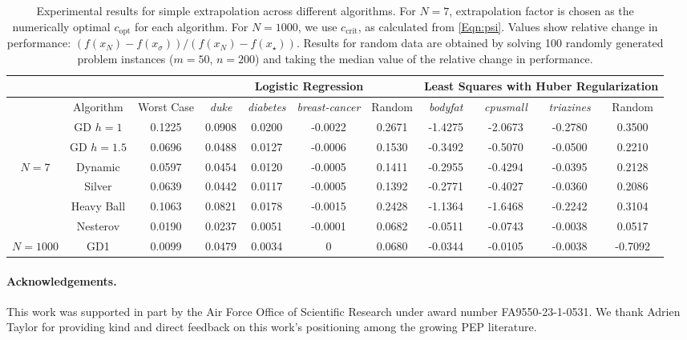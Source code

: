 \documentclass[11pt]{article}
\numberwithin{equation}{section}
\theoremstyle{definition}
\theoremstyle{definition}
\theoremstyle{definition}
\newcommand{\1}{\mathbf{1}}
\newcommand{\cCrit}{c_\mathrm{crit}}
\newcommand{\cOpt}{c_{\text{opt}}}
\begin{document}
\begin{table}
    \centering\scriptsize
    \begin{tabular}{|c|c|c|c|c|c|c|c|c|c|c|}
        \hline
         & & & \multicolumn{4}{|c|}{Logistic Regression} & \multicolumn{4}{|c|}{Least Squares with Huber Regularization} \\
        \hline
             & Algorithm & Worst Case & \textit{duke} & \textit{diabetes} & \textit{breast-cancer}  & Random & \textit{bodyfat} & \textit{cpusmall} & \textit{triazines} & Random\\
        \hline
         & GD $h=1$ & 0.1225 & 0.0908  & 0.0200 & -0.0022  & 0.2671 &
         -1.4275 & -2.0673 & -0.2780 & 0.3500 \\
         & GD $h=1.5$ & 0.0696 & 0.0488 & 0.0127 & -0.0006 & 0.1530 &
         -0.3492 & -0.5070 & -0.0500 & 0.2210 \\
         $N=7$ & Dynamic & 0.0597 & 0.0454 & 0.0120 & -0.0005 &  0.1411 &
         -0.2955 & -0.4294 & -0.0395 & 0.2128 \\
         & Silver & 0.0639 & 0.0442 & 0.0117 & -0.0005  & 0.1392 &
         -0.2771 & -0.4027 & -0.0360 & 0.2086 \\
         & Heavy Ball & 0.1063 & 0.0821 &  0.0178 & -0.0015  & 0.2428 &
         -1.1364 & -1.6468 & -0.2242 & 0.3104 \\
         & Nesterov & 0.0190 & 0.0237 & 0.0051 & -0.0001 & 0.0682  &
         -0.0511 & -0.0743 & -0.0038 & 0.0517 \\
         \hline
         $N=1000$ & GD1 & 0.0099 & 0.0479 & 0.0034 & 0 &  0.0680 & -0.0344 & -0.0105 & -0.0038 & -0.7092 \\
         \hline


    \end{tabular}
    \caption{Experimental results for simple extrapolation across different algorithms. For $N=7$, extrapolation factor is chosen as the numerically optimal $\cOpt$ for each algorithm. For $N=1000$, we use $\cCrit$, as calculated from \eqref{Eqn:psi}. Values show relative change in performance: $(f(x_N) - f(x_\sigma))/(f(x_N) - f(x_\star))$. Results for random data are obtained by solving 100 randomly generated problem instances ($m=50$, $n=200$) and taking the median value of the relative change in performance.}
    \label{Tbl:Experiments}
\end{table}

    \paragraph{Acknowledgements.} This work was supported in part by the Air Force Office of Scientific Research under award number FA9550-23-1-0531. We thank Adrien Taylor for providing kind and direct feedback on this work's positioning among the growing PEP literature.
    
\end{document}
